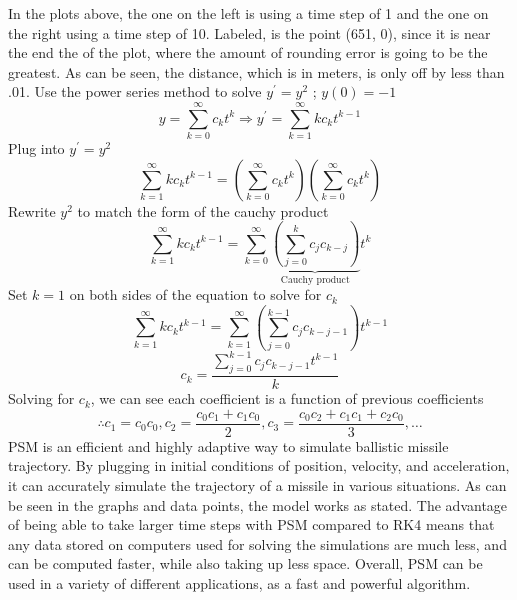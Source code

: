 \documentclass[25pt, a0paper, portrait]{tikzposter}
\begin{document}
\begin{columns}
{        In the plots above, the one on the left is using a time step of 1 and the one on the right
        using a time step of 10.  Labeled, is the point (651, 0), since it is near the end the of
        the plot, where the amount of rounding error is going to be the greatest.  As can be seen, 
        the distance, which is in meters, is only off by less than .01.
    }
    {
        Use the power series method to solve $y^\prime = y^2$ ; $y(0) = -1$
        \begin{equation*}
            y = \sum\limits_{k=0}^{\infty}c_kt^k \Rightarrow y^\prime = \sum\limits_{k=1}^{\infty}kc_kt^{k-1}
        \end{equation*}
        Plug into $y^\prime = y^2$
        \begin{equation*}
            \sum\limits_{k=1}^{\infty}kc_kt^{k-1} = \left(\sum\limits_{k=0}^{\infty}c_kt^k\right) \left(\sum\limits_{k=0}^{\infty}c_kt^k\right)
        \end{equation*}
        Rewrite $y^2$ to match the form of the cauchy product
        \begin{equation}
            \sum\limits_{k=1}^{\infty}kc_kt^{k-1} = \sum\limits_{k=0}^{\infty} \underbrace{\left(\sum\limits_{j=0}^{k}c_jc_{k-j}\right)}_{\text{Cauchy product}}t^k
        \end{equation}
        Set $k = 1$ on both sides of the equation to solve for $c_k$
        \begin{equation*}
            \sum\limits_{k=1}^{\infty}kc_kt^{k-1} = \sum\limits_{k=1}^{\infty} \left(\sum\limits_{j=0}^{k-1}c_jc_{k-j-1}\right)t^{k-1}
        \end{equation*}
        \begin{equation}
            c_k = \frac{\sum\limits_{j=0}^{k-1}c_jc_{k-j-1}t^{k-1}}{k}
        \end{equation}
        Solving for $c_k$, we can see each coefficient is a function of previous coefficients
        \begin{equation*}
            \therefore c_1 = c_0c_0, c_2 = \frac{c_0c_1 + c_1c_0}{2}, c_3 = \frac{c_0c_2 + c_1c_1+ c_2c_0}{3},\dots
        \end{equation*}
    }
    {
        PSM is an efficient and highly adaptive way to simulate ballistic missile trajectory.  By 
        plugging in initial conditions of position, velocity, and acceleration, it can accurately 
        simulate the trajectory of a missile in various situations. As can be seen in the graphs and 
        data points, the model works as stated.  The advantage of being able to take larger time 
        steps with PSM compared to RK4 means that any data stored on computers used for solving the 
        simulations are much less, and can be computed faster, while also taking up less space. 
        Overall, PSM can be used in a variety of different applications, as a fast and powerful 
        algorithm.
    }
\end{columns}
\end{document}
